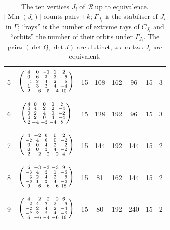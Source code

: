 \documentclass[11pt]{amsart}
\theoremstyle{definition}
\theoremstyle{remark}
\numberwithin{equation}{section}
\numberwithin{table}{section}
\numberwithin{figure}{section}
\newcommand{\Rk}{\mathcal{R}}
\newcommand{\Min}{\operatorname{Min}}
\begin{document}
\begin{table}[t]
\begin{tabular}{@{}c c c c c c c c@{}}
5 & $\vphantom{\rule[-19pt]{0pt}{42pt}}\left(\begin{smallmatrix}4&0&-1&1&2\\0&6&3&3&-6\\-1&3&4&2&-5\\1&3&2&4&-4\\2&-6&-5&-4&10\end{smallmatrix}\right)$ & 15 & 108 & 162 & 96 & 15 & 3\\
6 & $\vphantom{\rule[-19pt]{0pt}{42pt}}\left(\begin{smallmatrix}4&0&0&0&2\\0&4&2&2&-4\\0&2&4&0&-2\\0&2&0&4&-4\\2&-4&-2&-4&8\end{smallmatrix}\right)$ & 15 & 128 & 192 & 96 & 15 & 3\\
7 & $\vphantom{\rule[-19pt]{0pt}{42pt}}\left(\begin{smallmatrix}4&-2&0&0&2\\-2&4&0&0&-2\\0&0&4&2&-2\\0&0&2&4&-2\\2&-2&-2&-2&4\end{smallmatrix}\right)$ & 15 & 144 & 192 & 144 & 15 & 2\\
8 & $\vphantom{\rule[-19pt]{0pt}{42pt}}\left(\begin{smallmatrix}6&-3&-3&-3&9\\-3&4&2&1&-6\\-3&2&4&2&-6\\-3&1&2&4&-6\\9&-6&-6&-6&18\end{smallmatrix}\right)$ & 15 & 81 & 162 & 144 & 15 & 2\\
9 & $\vphantom{\rule[-19pt]{0pt}{42pt}}\left(\begin{smallmatrix}4&-2&-2&-2&6\\-2&4&2&2&-6\\-2&2&4&2&-4\\-2&2&2&4&-6\\6&-6&-4&-6&16\end{smallmatrix}\right)$ & 15 & 80 & 192 & 240 & 15 & 2\\
\bottomrule
\end{tabular}
\caption{The ten vertices $J_i$ of $\Rk$ up to equivalence. $|\Min(J_i)|$ counts pairs $\pm k$; $\Gamma_{J_i}$ is the stabiliser of $J_i$ in $\Gamma$; ``rays'' is the number of extreme rays of $C_{J_i}$ and ``orbits'' the number of their orbits under $\Gamma_{J_i}$. The pairs $(\det Q,\det J)$ are distinct, so no two $J_i$ are equivalent.}
\label{tab:vertices}
\end{table}
\end{document}
